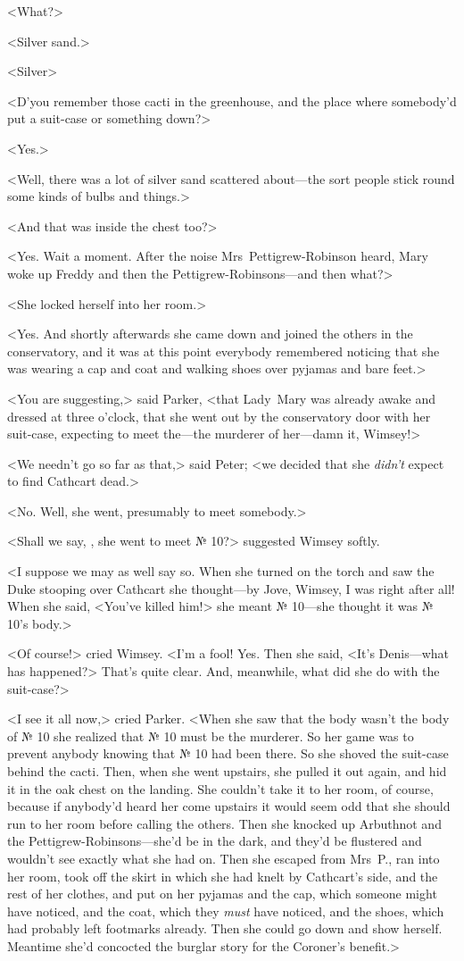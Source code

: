 <What?>

<Silver sand.>

<Silver\longdash>

<D'you remember those cacti in the greenhouse, and the place where somebody'd put a suit-case or something down?>

<Yes.>

<Well, there was a lot of silver sand scattered about—the sort people stick round some kinds of bulbs and things.>

<And that was inside the chest too?>

<Yes. Wait a moment. After the noise Mrs~Pettigrew-Robinson heard, Mary woke up Freddy and then the Pettigrew-Robinsons—and then what?>

<She locked herself into her room.>

<Yes. And shortly afterwards she came down and joined the others in the conservatory, and it was at this point everybody remembered noticing that she was wearing a cap and coat and walking shoes over pyjamas and bare feet.>

<You are suggesting,> said Parker, <that Lady~Mary was already awake and dressed at three o'clock, that she went out by the conservatory door with her suit-case, expecting to meet the—the murderer of her—damn it, Wimsey!>

<We needn't go so far as that,> said Peter; <we decided that she \emph{didn't} expect to find Cathcart dead.>

<No. Well, she went, presumably to meet somebody.>

<Shall we say, , she went to meet № 10?> suggested Wimsey softly.

<I suppose we may as well say so. When she turned on the torch and saw the Duke stooping over Cathcart she thought—by Jove, Wimsey, I was right after all! When she said, <You've killed him!> she meant № 10—she thought it was № 10's body.>

<Of course!> cried Wimsey. <I'm a fool! Yes. Then she said, <It's Denis—what has happened?> That's quite clear. And, meanwhile, what did she do with the suit-case?>

<I see it all now,> cried Parker. <When she saw that the body wasn't the body of № 10 she realized that № 10 must be the murderer. So her game was to prevent anybody knowing that № 10 had been there.  So she shoved the suit-case behind the cacti. Then, when she went upstairs, she pulled it out again, and hid it in the oak chest on the landing. She couldn't take it to her room, of course, because if anybody'd heard her come upstairs it would seem odd that she should run to her room before calling the others. Then she knocked up Arbuthnot and the Pettigrew-Robinsons—she'd be in the dark, and they'd be flustered and wouldn't see exactly what she had on. Then she escaped from Mrs~P\@., ran into her room, took off the skirt in which she had knelt by Cathcart's side, and the rest of her clothes, and put on her pyjamas and the cap, which someone might have noticed, and the coat, which they \emph{must} have noticed, and the shoes, which had probably left footmarks already. Then she could go down and show herself. Meantime she'd concocted the burglar story for the Coroner's benefit.>

